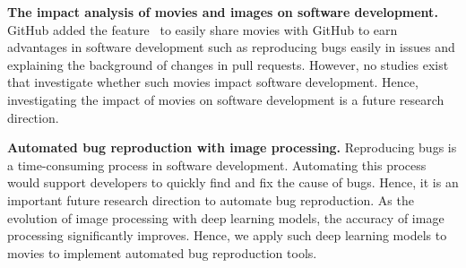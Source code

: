 \noindent
\textbf{The impact analysis of movies and images on software development.}
GitHub added the feature~\citep{github-video-blog} to easily 
share movies with GitHub to earn advantages 
in software development such as reproducing bugs easily in issues and 
explaining the background of changes in pull requests. 
However, no studies exist that investigate whether such movies 
impact software development. 
Hence, investigating the impact of movies on software development 
is a future research direction. 

\noindent
\textbf{Automated bug reproduction with image processing.}
Reproducing bugs is a time-consuming process 
in software development.
Automating this process would support developers 
to quickly find and fix the cause of bugs. 
Hence, it is an important future research direction 
to automate bug reproduction. 
As the evolution of image processing with deep learning models, 
the accuracy of image processing significantly improves. 
Hence, we apply such deep learning models to movies 
to implement automated bug reproduction tools. 